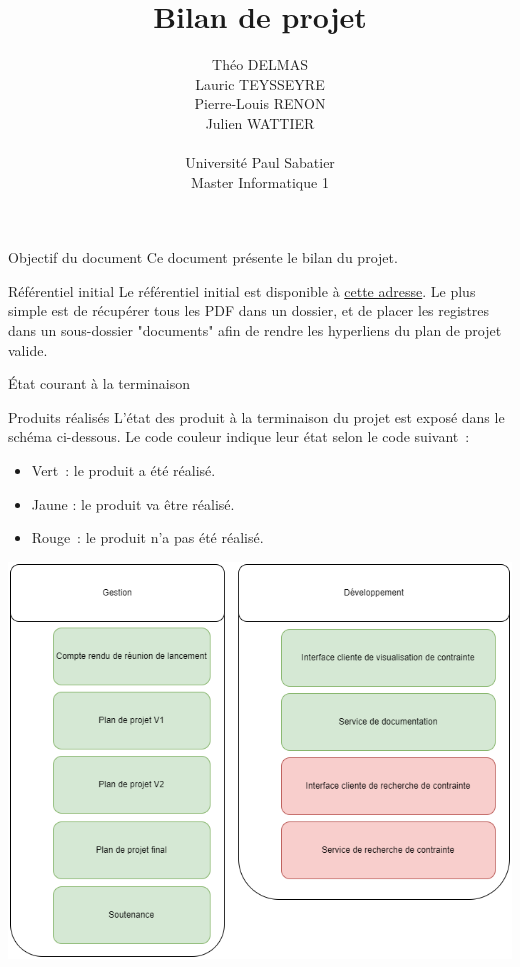 \documentclass[]{article}
\title{Bilan de projet}
\author{
    Théo DELMAS\\
    Lauric TEYSSEYRE\\
    Pierre-Louis RENON\\
    Julien WATTIER\\
    \\
    Université Paul Sabatier\\
    Master Informatique 1\\
   }
\begin{document}
\maketitle
\newpage
\tableofcontents
\newpage

\begin{section}{Objectif du document}
 Ce document présente le bilan du projet.
\end{section}

{
\setlength{\parindent}{0pt} %
\begin{section}{Référentiel initial}
 Le référentiel initial est disponible à \href{https://github.com/Szyckaa/UE-PROJET-DOCS-GESTION/releases/tag/2.0.0}{cette adresse}.
 Le plus simple est de récupérer tous les PDF dans un dossier, et de placer les registres dans un sous-dossier "documents" afin de rendre les hyperliens du plan de projet valide.
\end{section}

\begin{section}{État courant à la terminaison}
 \begin{subsection}{Produits réalisés}
     L’état des produit à la terminaison du projet est exposé dans le schéma ci-dessous. Le code couleur indique leur état selon le code suivant :

     \begin{itemize}
         \item Vert : le produit a été réalisé.
         \item Jaune : le produit va être réalisé.
         \item Rouge : le produit n’a pas été réalisé.
     \end{itemize}

     \includegraphics[scale=0.49]{IMG/PBS_final}


\end{subsection}
\end{section}}
\end{document}

